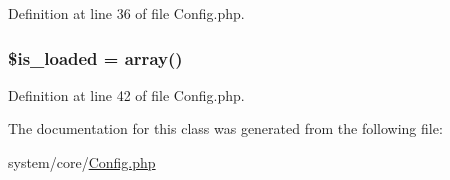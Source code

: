 Definition at line 36 of file Config.\-php.

\hypertarget{class_c_i___config_a908e9ad52a5d1956d360689452f6bdbe}{
\subsubsection[{\$is\-\_\-loaded}]{\setlength{\rightskip}{0pt plus 5cm}\$is\-\_\-loaded = array()}}\label{class_c_i___config_a908e9ad52a5d1956d360689452f6bdbe}


Definition at line 42 of file Config.\-php.



The documentation for this class was generated from the following file\-:\begin{DoxyCompactItemize}
\item 
system/core/\hyperlink{system_2core_2config_8php}{Config.\-php}\end{DoxyCompactItemize}
